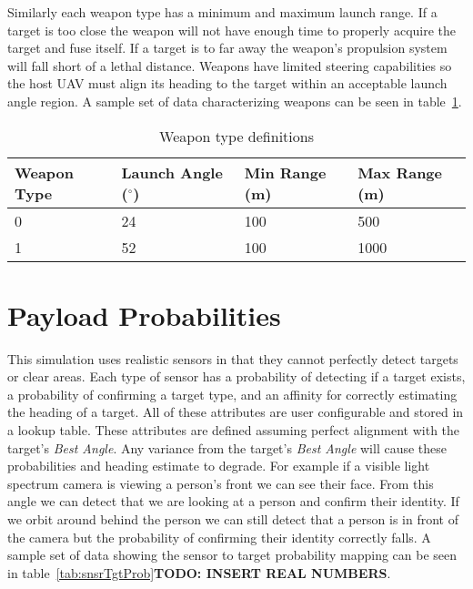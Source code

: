 Similarly each weapon type has a minimum and maximum launch range.  If a target is too close the weapon will not have enough time to properly acquire the target and fuse itself.  If a target is to far away the weapon's propulsion system will fall short of a lethal distance.  Weapons have limited steering capabilities so the host UAV must align its heading to the target within an acceptable launch angle region. A sample set of data characterizing weapons can be seen in table~\ref{tab:weaponType}.


\begin{table}[H]
	\caption{Weapon type definitions}
	\centering
	\label{tab:weaponType}
	\begin{tabular}{|p{1.5cm}|p{1.75cm}|p{1cm}|p{1cm}|}
		\hline
		Weapon Type & Launch Angle ($^{\circ}$) & Min Range (m) & Max Range (m)\\ \hline
		0 & 24 & 100 & 500 \\
		1 & 52 & 100 & 1000 \\
		\hline
	\end{tabular}
\end{table}

\section{Payload Probabilities}
This simulation uses realistic sensors in that they cannot perfectly detect targets or clear areas.  Each type of sensor has a probability of detecting if a target exists, a probability of confirming a target type, and an affinity for correctly estimating the heading of a target.  All of these attributes are user configurable and stored in a lookup table.  These attributes are defined assuming perfect alignment with the target's \textit{Best Angle}.  Any variance from the target's \textit{Best Angle} will cause these probabilities and heading estimate to degrade.  For example if a visible light spectrum camera is viewing a person's front we can see their face.  From this angle we can detect that we are looking at a person and confirm their identity.  If we orbit around behind the person we can still detect that a person is in front of the camera but the probability of confirming their identity correctly falls.  A sample set of data showing the sensor to target probability mapping can be seen in table~\ref{tab:snsrTgtProb}\textbf{TODO: INSERT REAL NUMBERS}.

